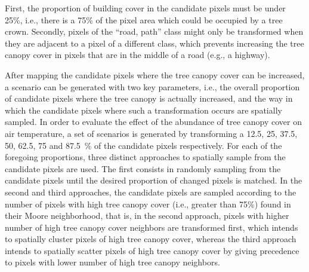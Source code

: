 \documentclass[10pt,letterpaper]{article}
\begin{document}
First, the proportion of building cover in the candidate pixels must be under 25\%, i.e., there is a 75\% of the pixel area which could be occupied by a tree crown.
Secondly, pixels of the ``road, path'' class might only be transformed when they are adjacent to a pixel of a different class, which prevents increasing the tree canopy cover in pixels that are in the middle of a road (e.g., a highway).


After mapping the candidate pixels where the tree canopy cover can be increased, a scenario can be generated with two key parameters, i.e., the overall proportion of candidate pixels where the tree canopy is actually increased, and the way in which the candidate pixels where such a transformation occurs are spatially sampled.
In order to evaluate the effect of the abundance of tree canopy cover on air temperature, a set of scenarios is generated by transforming a 12.5, 25, 37.5, 50, 62.5, 75 and 87.5~\% of the candidate pixels respectively.
For each of the foregoing proportions, three distinct approaches to spatially sample from the candidate pixels are used. The first consists in randomly sampling from the candidate pixels until the desired proportion of changed pixels is matched.
In the second and third approaches, the candidate pixels are sampled according to the number of pixels with high tree canopy cover (i.e., greater than 75\%) found in their Moore neighborhood, that is, in the second approach, pixels with higher number of high tree canopy cover neighbors are transformed first, which intends to spatially cluster pixels of high tree canopy cover, whereas the third approach intends to spatially scatter pixels of high tree canopy cover by giving precedence to pixels with lower number of high tree canopy neighbors.
\end{document}

